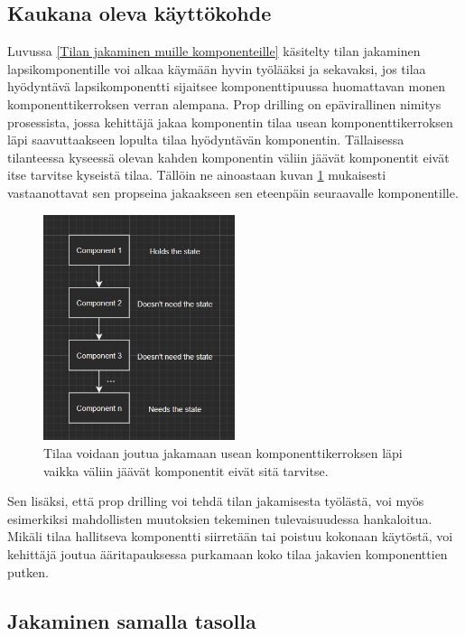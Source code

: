 \subsection{Kaukana oleva käyttökohde}
\label{Kaukana oleva käyttökohde}
Luvussa \ref{Tilan jakaminen muille komponenteille} käsitelty tilan jakaminen lapsikomponentille voi alkaa käymään hyvin työlääksi ja sekavaksi, jos tilaa hyödyntävä lapsikomponentti sijaitsee komponenttipuussa huomattavan monen komponenttikerroksen verran alempana. Prop drilling on epävirallinen nimitys prosessista, jossa kehittäjä jakaa komponentin tilaa usean komponenttikerroksen läpi saavuttaakseen lopulta tilaa hyödyntävän komponentin. Tällaisessa tilanteessa kyseessä olevan kahden komponentin väliin jäävät komponentit eivät itse tarvitse kyseistä tilaa. Tällöin ne ainoastaan kuvan \ref{fig:drilling} mukaisesti vastaanottavat sen propseina jakaakseen sen eteenpäin seuraavalle komponentille. \cite{kentcdodds2}
\begin{figure}[h]
\centering \includegraphics[width=0.5\textwidth]{kuvat/Prop Drilling.png}
\caption{Tilaa voidaan joutua jakamaan usean komponenttikerroksen läpi vaikka väliin jäävät komponentit eivät sitä tarvitse.}
\label{fig:drilling} 
\end{figure}

Sen lisäksi, että prop drilling voi tehdä tilan jakamisesta työlästä, voi myös esimerkiksi mahdollisten muutoksien tekeminen tulevaisuudessa hankaloitua. Mikäli tilaa hallitseva komponentti siirretään tai poistuu kokonaan käytöstä, voi kehittäjä joutua ääritapauksessa purkamaan koko tilaa jakavien komponenttien putken.


\subsection{Jakaminen samalla tasolla}
\label{Jakaminen samalla tasolla}


